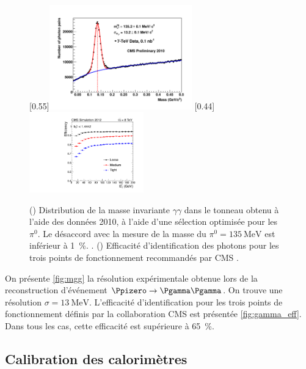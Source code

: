 \begin{figure}[tbp]
    \centering
    \subcaptionbox{\label{fig:mgg}}[0.55\textwidth]{\includegraphics[width=0.55\textwidth]{chapitre3/figs/pf_photons.pdf}} \hfill
    \subcaptionbox{\label{fig:gamma_eff}}[0.44\textwidth]{\includegraphics[width=0.44\textwidth]{chapitre3/figs/photon_eff.pdf}}
    \caption{() Distribution de la masse invariante $\gamma\gamma$ dans le tonneau obtenu à l'aide des données 2010, à l'aide d'une sélection optimisée pour les $\pi^0$. Le désaccord avec la mesure de la masse du $\pi^0 = \SI{135}{\MeV}$ est inférieur à \SI{1}{\%}. \citep{cms_pf_jets}. () Efficacité d'identification des photons pour les trois points de fonctionnement recommandés par CMS \citep{cms_photon_perf}.}
    \label{fig:pf_photons}
\end{figure}

On présente \cref{fig:mgg} la résolution expérimentale obtenue lors de la reconstruction d'événement $\Ppizero \rightarrow \Pgamma \Pgamma$. On trouve une résolution $\sigma = \SI{13}{\MeV}$. L'efficacité d'identification pour les trois points de fonctionnement définis par la collaboration CMS est présentée \cref{fig:gamma_eff}. Dans tous les cas, cette efficacité est supérieure à \SI{65}{\%}.

\subsection{Calibration des calorimètres}

